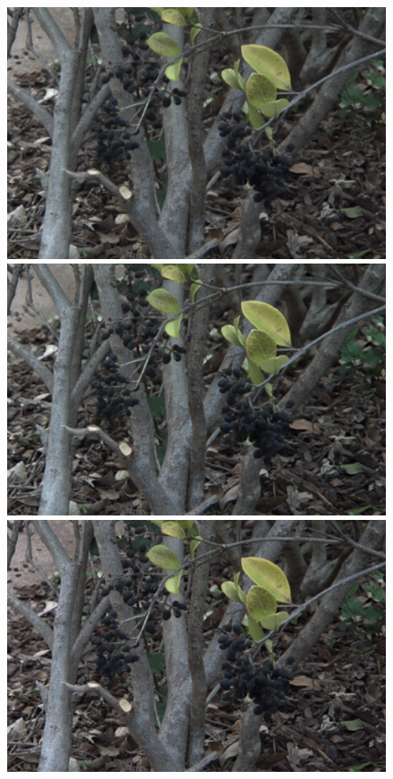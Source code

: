\documentclass[10pt,twocolumn,letterpaper]{article}
\begin{document}
\begin{figure}[p]
    \begin{multicols}{3}
        \includegraphics[width=\linewidth]{flowers_25/kalantari_05_05.png}
        \includegraphics[width=\linewidth]{flowers_25/ours_05_05.png}
        \includegraphics[width=\linewidth]{flowers_25/truth_05_05.png}

\end{multicols}
\end{figure}
\end{document}

